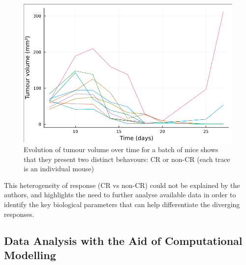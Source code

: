 \documentclass[11pt]{article}
\begin{document}
\begin{figure}[!ht]
    \centering\includegraphics[scale=0.3]{crnoncr2.png}
    \caption{Evolution of tumour volume over time for a batch of mice shows that they present two distinct behavours: CR or non-CR (each trace is an individual mouse)}
    \label{fig:outcomedual}
\end{figure}

This heterogeneity of response (CR vs non-CR) could not be explained by the authors, and highlights the need to further analyse available data in order to identify the key biological parameters that can help differentiate the diverging responses.

\subsection{Data Analysis with the Aid of Computational Modelling}\label{ssec:prevWork}
\end{document}
